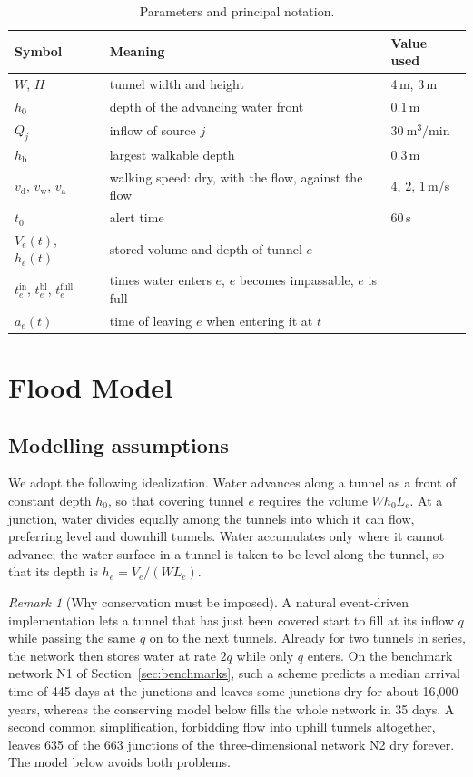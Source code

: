 \documentclass[11pt,a4paper]{article}
\theoremstyle{plain}
\theoremstyle{definition}
\theoremstyle{remark}
\newtheorem{remark}{Remark}
\newcommand{\tin}{t^{\mathrm{in}}}
\newcommand{\tbl}{t^{\mathrm{bl}}}
\newcommand{\tfull}{t^{\mathrm{full}}}
\newcommand{\hb}{h_{\mathrm{b}}}
\newcommand{\vd}{v_{\mathrm{d}}}
\newcommand{\vw}{v_{\mathrm{w}}}
\newcommand{\va}{v_{\mathrm{a}}}
\begin{document}
\begin{table}[htbp]
  \centering\small
  \begin{tabular}{@{}l l l@{}}
    \toprule
    Symbol & Meaning & Value used \\
    \midrule
    $W$, $H$ & tunnel width and height & 4\,m, 3\,m \\
    $h_0$ & depth of the advancing water front & 0.1\,m \\
    $Q_j$ & inflow of source $j$ & $30\ \mathrm{m^3/min}$ \\
    $\hb$ & largest walkable depth & 0.3\,m \\
    $\vd$, $\vw$, $\va$ & walking speed: dry, with the flow, against the flow & 4, 2, 1\,m/s \\
    $t_0$ & alert time & 60\,s \\
    \midrule
    $V_e(t)$, $h_e(t)$ & stored volume and depth of tunnel $e$ & \\
    $\tin_e$, $\tbl_e$, $\tfull_e$ & times water enters $e$, $e$ becomes impassable, $e$ is full & \\
    $a_e(t)$ & time of leaving $e$ when entering it at $t$ & \\
    \bottomrule
  \end{tabular}
  \caption{Parameters and principal notation.}
  \label{tab:params}
\end{table}

\section{Flood Model}\label{sec:flood}

\subsection{Modelling assumptions}
We adopt the following idealization. Water advances along a tunnel as a front of constant depth $h_0$, so that covering tunnel $e$ requires the volume $W h_0 L_e$. At a junction, water divides equally among the tunnels into which it can flow, preferring level and downhill tunnels. Water accumulates only where it cannot advance; the water surface in a tunnel is taken to be level along the tunnel, so that its depth is $h_e = V_e/(W L_e)$.

\begin{remark}[Why conservation must be imposed]\label{rem:naive}
A natural event-driven implementation lets a tunnel that has just been covered start to fill at its inflow $q$ while passing the same $q$ on to the next tunnels. Already for two tunnels in series, the network then stores water at rate $2q$ while only $q$ enters. On the benchmark network N1 of Section~\ref{sec:benchmarks}, such a scheme predicts a median arrival time of 445 days at the junctions and leaves some junctions dry for about 16{,}000 years, whereas the conserving model below fills the whole network in 35 days. A second common simplification, forbidding flow into uphill tunnels altogether, leaves 635 of the 663 junctions of the three-dimensional network N2 dry forever. The model below avoids both problems.
\end{remark}
\end{document}

